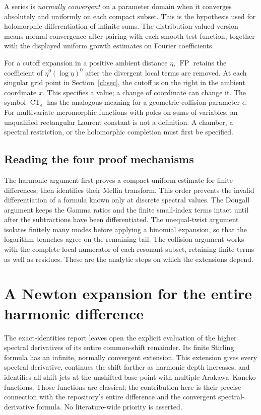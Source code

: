 \documentclass[11pt,a4paper]{article}
\numberwithin{equation}{section}
\theoremstyle{definition}
\theoremstyle{remark}
\DeclareMathOperator{\FP}{FP}
\DeclareMathOperator{\CT}{CT}
\begin{document}
A series is \emph{normally convergent} on a parameter domain when
it converges absolutely and uniformly on each compact subset.
This is the hypothesis used for holomorphic differentiation of
infinite sums. The distribution-valued version means normal
convergence after pairing with each smooth test function, together
with the displayed uniform growth estimates on Fourier coefficients.

For a cutoff expansion in a positive ambient distance $\eta$,
$\FP$ retains the coefficient of $\eta^0(\log\eta)^0$ after
the divergent local terms are removed. At each singular grid
point in Section~\ref{cl:sec}, the cutoff is on the right in
the ambient coordinate $x$. This specifies a value; a change of
coordinate can change it. The symbol $\CT_\epsilon$ has the
analogous meaning for a geometric collision parameter $\epsilon$.
For multivariate meromorphic functions with poles on sums of
variables, an unqualified rectangular Laurent constant is not a
definition. A chamber, a spectral restriction, or the holomorphic
completion must first be specified.

\subsection{Reading the four proof mechanisms}

The harmonic argument first proves a compact-uniform estimate for
finite differences, then identifies their Mellin transform. This
order prevents the invalid differentiation of a formula known only
at discrete spectral values. The Dougall argument keeps the Gamma
ratios and the finite small-index terms intact until after the
subtractions have been differentiated. The unequal-twist argument
isolates finitely many modes before applying a binomial expansion,
so that the logarithm branches agree on the remaining tail.
The collision argument works with the complete local numerator of
each resonant subset, retaining finite terms as well as residues.
These are the analytic steps on which the extensions depend.

\clearpage
\section{A Newton expansion for the entire harmonic difference}
\label{hn:sec:newton}

The exact-identities report \cite{RepoExact} leaves open the explicit evaluation of the
higher spectral derivatives of its entire common-shift remainder.
Its finite Stirling formula has an infinite, normally convergent
extension. This extension gives every spectral derivative, continues
the shift farther as harmonic depth increases, and identifies all shift
jets at the unshifted base point with multiple Arakawa--Kaneko functions.
Those functions are classical; the contribution here is their precise
connection with the repository's entire difference and the convergent
spectral-derivative formula. No literature-wide priority is asserted.
\end{document}
